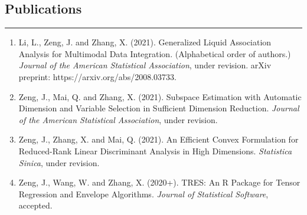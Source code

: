 \documentclass[10pt, oneside]{article}
\begin{document}
\subsection*{Publications}
\noindent\rule{\textwidth}{1pt}
\begin{enumerate}[itemsep=0pt]
    \item 
    Li, L., Zeng, J. and Zhang, X. (2021). Generalized Liquid Association Analysis for Multimodal Data Integration. (Alphabetical order of authors.) \textit{Journal of the American Statistical Association}, under revision. arXiv preprint: https://arxiv.org/abs/2008.03733.

    \item Zeng, J., Mai, Q. and Zhang, X. (2021). Subspace Estimation with Automatic Dimension and Variable Selection in Sufficient Dimension Reduction. \textit{Journal of the American Statistical Association}, under revision.
    
    \item Zeng, J., Zhang, X. and Mai, Q. (2021). An Efficient Convex Formulation for Reduced-Rank Linear Discriminant Analysis in High Dimensions. \textit{Statistica Sinica}, under revision.
    
    \item Zeng, J., Wang, W. and Zhang, X. (2020+). TRES: An R Package for Tensor Regression and Envelope Algorithms. \textit{Journal of Statistical Software}, accepted. 
\end{enumerate}
\end{document}
